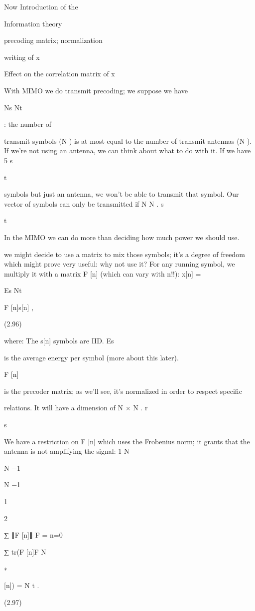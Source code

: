 {Now Introduction of the

Information theory

precoding matrix;
normalization

writing of x

Effect on the correlation matrix of x

With MIMO we do transmit precoding; we suppose we have

Ns \leq Nt

: the number of

transmit symbols (N ) is at most equal to the number of transmit antennas (N ).
If we're not using an antenna, we can think about what to do with it. If we have 5 s

t

symbols but just an antenna, we won't be able to transmit that symbol. Our vector of symbols can only be transmitted if N \leq N .
s

t

In the MIMO we can do more than deciding how much power we should use.

we might decide to use a matrix to mix those symbols; it's a degree of freedom which might prove very useful: why not use it?
For any running symbol, we multiply it with a matrix F [n] (which can vary with n!!):
x[n] = \sqrt

Es Nt

F [n]s[n] ,

(2.96)

where:
The s[n] symbols are IID.
Es

is the average energy per symbol (more about this later).

F [n]

is the precoder matrix; as we'll see, it's normalized in order to respect specific

relations. It will have a dimension of N × N .
r

s

We have a restriction on F [n] which uses the Frobenius norm; it grants that the antenna is not amplifying the signal:
1 N

N −1

N −1

1

2

∑ ∥F [n]∥ F =
n=0

∑ tr(F [n]F N

∗

[n]) = N t .

(2.97)

}
